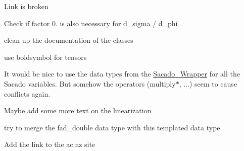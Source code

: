 
\begin{DoxyRefList}
\item[\label{todo__todo000001}%
\Hypertarget{todo__todo000001}%
page \hyperlink{index}{Trilinos\+:\+:Sacado example documentation} ]Link is broken

Check if factor 0. is also necessary for d\+\_\+sigma / d\+\_\+phi

clean up the documentation of the classes 

use boldsymbol for tensors 

It would be nice to use the data types from the \hyperlink{namespaceSacado__Wrapper}{Sacado\+\_\+\+Wrapper} for all the Sacado variables. But somehow the operators (multiply$\ast$, ...) seem to cause conflicts again.

Maybe add some more text on the linearization 

try to merge the fad\+\_\+double data type with this templated data type 

Add the link to the ac.\+nz site
\end{DoxyRefList}